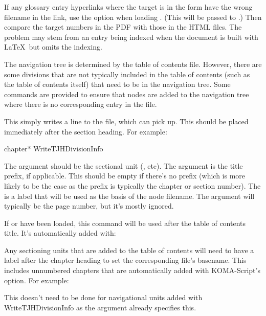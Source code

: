 \documentclass[toc=listof]{scrreport}
\begin{document}
\begin{information}
If any glossary entry hyperlinks where the target is in the form
 have the wrong filename in the link,
use the  option when loading
. (This will be passed to .)
Then compare the target numbers in the PDF with those in the HTML
files. The problem may stem from an entry being indexed when the
document is built with \LaTeX\ but  omits the
indexing.
\end{information}

The navigation tree is determined by the table of contents 
file. However, there are some divisions that are not typically
included in the table of contents (such as the table of contents
itself) that need to be in the navigation tree.
Some commands are provided to ensure that nodes are added to the
navigation tree where there is no corresponding entry in the
 file.

This simply writes a line to the  file, which
 can pick up. This should be placed immediately
after the section heading. For example:
\begin{codebox}
\gls{chapter}*
\gls{WriteTJHDivisionInfo}\marg{}
\end{codebox}
The  argument should be the sectional unit
(,  etc). The  argument is
the title prefix, if applicable. This should be empty if there's no
prefix (which is more likely to be the case as the prefix is
typically the chapter or section number). The  is a
label that will be used as the basis of the node filename.
The  argument will typically be the page number, but
it's mostly ignored.

If  or  have been loaded, this command
will be used after the table of contents title. It's automatically added with:
\begin{compactcodebox}
\end{compactcodebox}

Any sectioning units that are added to the table of
contents will need to have a label after the chapter heading
to set the corresponding file's basename.  This includes unnumbered
chapters that are automatically added with KOMA-Script's
 option. For example:
\begin{compactcodebox}
\end{compactcodebox}
This doesn't need to be done for navigational units added with 
\gls{WriteTJHDivisionInfo} as the  argument already specifies
this.
\end{document}
